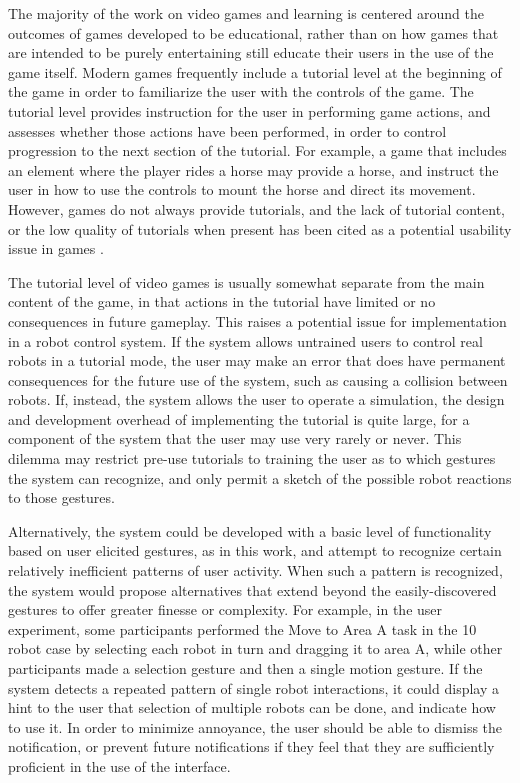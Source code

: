 The majority of the work on video games and learning is centered around the outcomes of games developed to be educational, rather than on how games that are intended to be purely entertaining still educate their users in the use of the game itself.
Modern games frequently include a tutorial level at the beginning of the game in order to familiarize the user with the controls of the game. 
The tutorial level provides instruction for the user in performing game actions, and assesses whether those actions have been performed, in order to control progression to the next section of the tutorial. 
For example, a game that includes an element where the player rides a horse may provide a horse, and instruct the user in how to use the controls to mount the horse and direct its movement. 
However, games do not always provide tutorials, and the lack of tutorial content, or the low quality of tutorials when present has been cited as a potential usability issue in games \citep{pinelle2008heuristic}.

The tutorial level of video games is usually somewhat separate from the main content of the game, in that actions in the tutorial have limited or no consequences in future gameplay. 
This raises a potential issue for implementation in a robot control system. 
If the system allows untrained users to control real robots in a tutorial mode, the user may make an error that does have permanent consequences for the future use of the system, such as causing a collision between robots. 
If, instead, the system allows the user to operate a simulation, the design and development overhead of implementing the tutorial is quite large, for a component of the system that the user may use very rarely or never. 
This dilemma may restrict pre-use tutorials to training the user as to which gestures the system can recognize, and only permit a sketch of the possible robot reactions to those gestures. 

Alternatively, the system could be developed with a basic level of functionality based on user elicited gestures, as in this work, and attempt to recognize certain relatively inefficient patterns of user activity. 
When such a pattern is recognized, the system would propose alternatives that extend beyond the easily-discovered gestures to offer greater finesse or complexity. 
For example, in the user experiment, some participants performed the Move to Area A task in the 10 robot case by selecting each robot in turn and dragging it to area A, while other participants made a selection gesture and then a single motion gesture. 
If the system detects a repeated pattern of single robot interactions, it could display a hint to the user that selection of multiple robots can be done, and indicate how to use it. 
In order to minimize annoyance, the user should be able to dismiss the notification, or prevent future notifications if they feel that they are sufficiently proficient in the use of the interface. 


